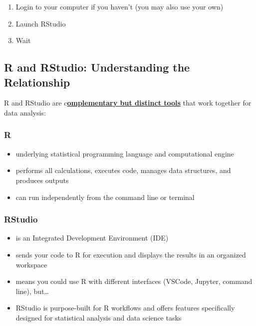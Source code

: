 \documentclass[
  letterpaper,
  DIV=11,
  numbers=noendperiod]{scrartcl}
\begin{document}
\begin{enumerate}
\def\labelenumi{\arabic{enumi}.}
\item
  Login to your computer if you haven't (you may also use your own)
\item
  Launch RStudio
\item
  Wait
\end{enumerate}

\subsection{R and RStudio: Understanding the
Relationship}\label{r-and-rstudio-understanding-the-relationship}

R and RStudio are c\ul{\textbf{omplementary but distinct tools}} that
work together for data analysis:

\subsubsection{\texorpdfstring{\textbf{R}}{R}}\label{r}

\begin{itemize}
\item
  underlying statistical programming language and computational engine
\item
  performs all calculations, executes code, manages data structures, and
  produces outputs
\item
  can run independently from the command line or terminal
\end{itemize}

\subsubsection{\texorpdfstring{\textbf{RStudio}}{RStudio}}\label{rstudio}

\begin{itemize}
\item
  is an Integrated Development Environment (IDE)
\item
  sends your code to R for execution and displays the results in an
  organized workspace
\item
  means you could use R with different interfaces (VSCode, Jupyter,
  command line), but\ldots{}
\item
  RStudio is purpose-built for R workflows and offers features
  specifically designed for statistical analysis and data science tasks
\end{itemize}
\end{document}
